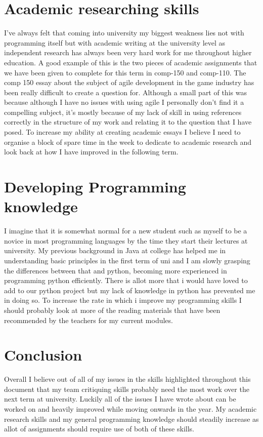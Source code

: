 \documentclass{scrartcl}
\begin{document}
\section{Academic researching skills}

I've always felt that coming into university my biggest weakness lies not with programming itself but with academic writing at the university level as independent research has always been very hard work for me throughout higher education. A good example of this is the two pieces of academic assignments that we have been given to complete for this term in comp-150 and comp-110. The comp 150 essay about the subject of agile development in the game industry has been really difficult to create a question for. Although a small part of this was because although I have no issues with using agile I personally don't find it a compelling subject, it's mostly because of my lack of skill in using references correctly in the structure of my work and relating it to the question that I have posed. To increase my ability at creating academic essays I believe I need to organise a block of spare time in the week to dedicate to academic research and look back at how I have improved in the following term.
\section{Developing Programming knowledge}

I imagine that it is somewhat normal for a new student such as myself to be a novice in most programming languages by the time they start their lectures at university. My previous background in Java at college has helped me in understanding basic principles in the first term of uni and I am slowly grasping the differences between that and python, becoming more experienced in programming python efficiently. There is allot more that i would have loved to add to our python project but my lack of knowledge in python has prevented me in doing so. To increase the rate in which i improve my programming skills I should probably look at more of the reading materials that have been recommended by the teachers for my current modules. 


\section{Conclusion}

Overall I believe out of all of my issues in the skills highlighted throughout this document that my team critiquing skills probably need the most work over the next term at university. Luckily all of the issues I have wrote about can be worked on and heavily improved while moving onwards in the year. My academic research skills and my general programming knowledge should steadily increase as allot of assignments should require use of both of these skills.  



\end{document}
